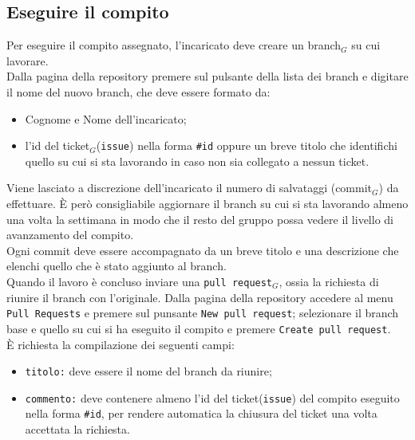 \subsection{Eseguire il compito}
Per eseguire il compito assegnato, l'incaricato deve creare un branch$_{G}$ su cui lavorare. \\
Dalla pagina della repository premere sul pulsante della lista dei branch e digitare il nome del nuovo branch, che deve essere formato da:
    \begin{itemize}
    \item Cognome e Nome dell'incaricato;
    \item l'id del ticket$_{G}$(\texttt{issue}) nella forma \texttt{\#id} oppure un breve titolo che identifichi quello su cui si sta lavorando in caso non sia collegato a nessun ticket.
    \end{itemize}
Viene lasciato a discrezione dell'incaricato il numero di salvataggi (commit$_{G}$) da effettuare. È però consigliabile aggiornare il branch su cui si sta lavorando almeno una volta la settimana in modo che il resto del gruppo possa vedere il livello di avanzamento del compito. \\
Ogni commit deve essere accompagnato da un breve titolo e una descrizione che elenchi quello che è stato aggiunto al branch. \\
Quando il lavoro è concluso inviare una \texttt{pull request}$_{G}$, ossia la richiesta di riunire il branch con l'originale. Dalla pagina della repository accedere al menu \texttt{Pull Requests} e premere sul punsante \texttt{New pull request}; selezionare il branch base e quello su cui si ha eseguito il compito e premere \texttt{Create pull request}.\\ È richiesta la compilazione dei seguenti campi:
\begin{itemize}
    \item \texttt{titolo:} deve essere il nome del branch da riunire;
    \item \texttt{commento:} deve contenere almeno l'id del ticket(\texttt{issue}) del compito eseguito nella forma \texttt{\#id}, per rendere automatica la chiusura del ticket una volta accettata la richiesta. 
\end{itemize}

